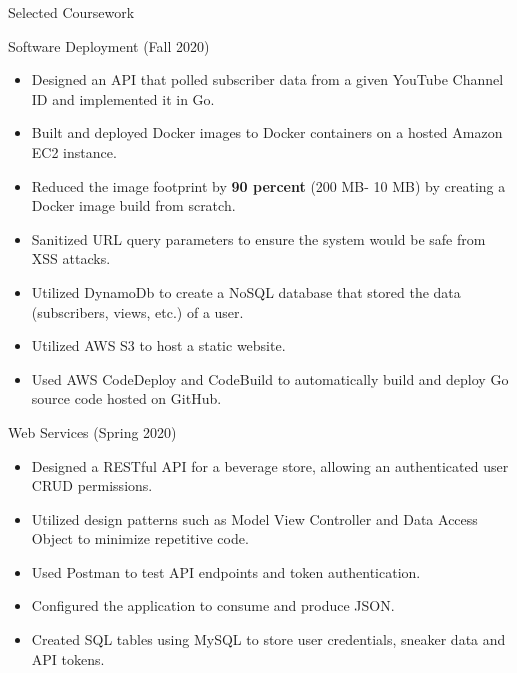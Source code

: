 \documentclass[]{johnsoncv}
\begin{document}
	\begin{cvsection}{Selected Coursework}

		\begin{cvsubsection}{Software Deployment (Fall 2020)}{}{}
			\begin{itemize}
				\item Designed an API that polled subscriber data from a given YouTube Channel ID and implemented it in Go.
				\item Built and deployed Docker images to Docker containers on a hosted Amazon EC2 instance.
				\item Reduced the image footprint by \textbf{90 percent} (200 MB- 10 MB) by creating a Docker image build from scratch.
				\item Sanitized URL query parameters to ensure the system would be safe from XSS attacks.
				\item Utilized DynamoDb to create a NoSQL database that stored the data (subscribers, views, etc.) of a user.
				\item Utilized AWS S3 to host a static website.
				\item Used AWS CodeDeploy and CodeBuild to automatically build and deploy Go source code hosted on GitHub.
			\end{itemize}
		\end{cvsubsection}

		\begin{cvsubsection}{Web Services (Spring 2020)}{}{}
			\begin{itemize}
				\item Designed a RESTful API for a beverage store, allowing an authenticated user CRUD permissions.
				\item Utilized design patterns such as Model View Controller and Data Access Object to minimize repetitive code.
				\item Used Postman to test API endpoints and token authentication.
				\item Configured the application to consume and produce JSON.
				\item Created SQL tables using MySQL to store user credentials, sneaker data and API tokens.
			\end{itemize}
		\end{cvsubsection}
		


\end{cvsection}
\end{document}
